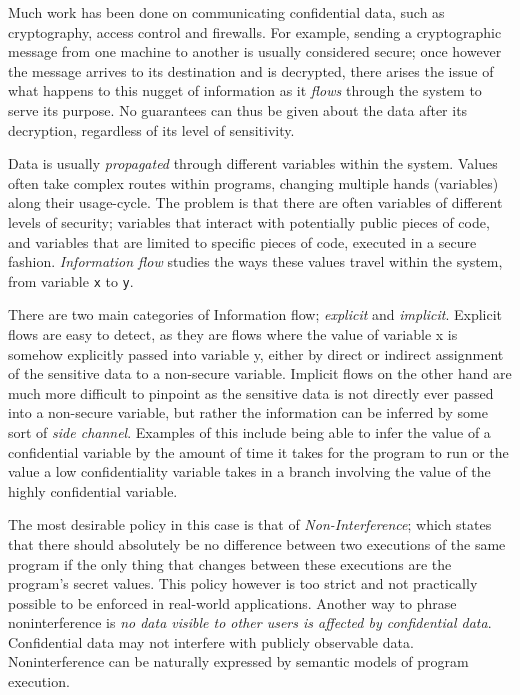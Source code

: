 \documentclass[11pt,letterpaper]{article}
\begin{document}
Much work has been done on communicating confidential data, such as cryptography, access control and firewalls. For example, sending a cryptographic message from one machine to another is usually considered secure; once however the message arrives to its destination and is decrypted, there arises the issue of what happens to this nugget of information as it \textit{flows} through the system to serve its purpose. No guarantees can thus be given about the data after its decryption, regardless of its level of sensitivity.

Data is usually \textit{propagated} through different variables within  the system. Values often take complex routes within programs, changing multiple hands (variables) along their usage-cycle. The problem is that there are often variables of different levels of security; variables that interact with potentially public pieces of code, and variables that are limited to specific pieces of code, executed in a secure fashion. \textit{Information flow} studies the ways these values travel within the system, from variable \texttt{x} to \texttt{y}.

There are two main categories of Information flow; \textit{explicit} and \textit{implicit}. Explicit flows are easy to detect, as they are flows where the value of variable x is somehow explicitly passed into variable y, either by direct or indirect assignment of the sensitive data to a non-secure variable. Implicit flows on the other hand are much more difficult to pinpoint as the sensitive data is not directly ever passed into a non-secure variable, but rather the information can be inferred by some sort of \textit{side channel}. Examples of this include being able to infer the value of a confidential variable by the amount of time it takes for the program to run or the value a low confidentiality variable takes in a branch involving the value of the highly confidential variable.

The most desirable policy in this case is that of \textit{Non-Interference}; which states that there should absolutely be no difference between two executions of the same program if the only thing that changes between these executions are the program's secret values. This policy however is too strict and not practically possible to be enforced in real-world applications. Another way to phrase noninterference is \textit{no data visible to other users is affected by confidential data}. Confidential data may not interfere with publicly observable data. Noninterference can be naturally expressed by semantic models of program execution.
\end{document}

